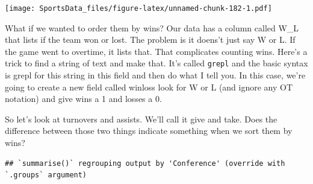 \documentclass[
]{book}
\newenvironment{Shaded}{\begin{snugshade}}{\end{snugshade}}
\newcommand{\DataTypeTok}[1]{\textcolor[rgb]{0.13,0.29,0.53}{#1}}
\newcommand{\DecValTok}[1]{\textcolor[rgb]{0.00,0.00,0.81}{#1}}
\newcommand{\KeywordTok}[1]{\textcolor[rgb]{0.13,0.29,0.53}{\textbf{#1}}}
\newcommand{\NormalTok}[1]{#1}
\newcommand{\OperatorTok}[1]{\textcolor[rgb]{0.81,0.36,0.00}{\textbf{#1}}}
\newcommand{\StringTok}[1]{\textcolor[rgb]{0.31,0.60,0.02}{#1}}
\begin{document}
\texttt{[image: SportsData\_files/figure-latex/unnamed-chunk-182-1.pdf]}

What if we wanted to order them by wins? Our data has a column called W\_L that lists if the team won or lost. The problem is it doens't just say W or L. If the game went to overtime, it lists that. That complicates counting wins. Here's a trick to find a string of text and make that. It's called \texttt{grepl} and the basic syntax is grepl for this string in this field and then do what I tell you. In this case, we're going to create a new field called winloss look for W or L (and ignore any OT notation) and give wins a 1 and losses a 0.

\begin{Shaded}
\end{Shaded}

So let's look at turnovers and assists. We'll call it give and take. Does the difference between those two things indicate something when we sort them by wins?

\begin{Shaded}
\end{Shaded}

\begin{verbatim}
## `summarise()` regrouping output by 'Conference' (override with `.groups` argument)
\end{verbatim}

\begin{Shaded}
\end{Shaded}
\end{document}
